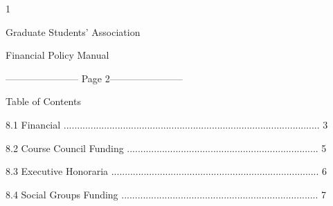                                                                          1  

                                               

                                               

                                              Graduate Students’ Association  

                                                   Financial Policy Manual  

  


----------------------- Page 2-----------------------

                                                 Table of Contents  

                                                  

8.1         Financial ............................................................................................... 3  



8.2         Course Council Funding ....................................................................... 5  



8.3         Executive Honoraria ............................................................................. 6  



8.4         Social Groups Funding ......................................................................... 7  

  

  

  

  

  

  

  

  

  

  

  

  

  

  

  

  

  

  

  

  

  

  

  

